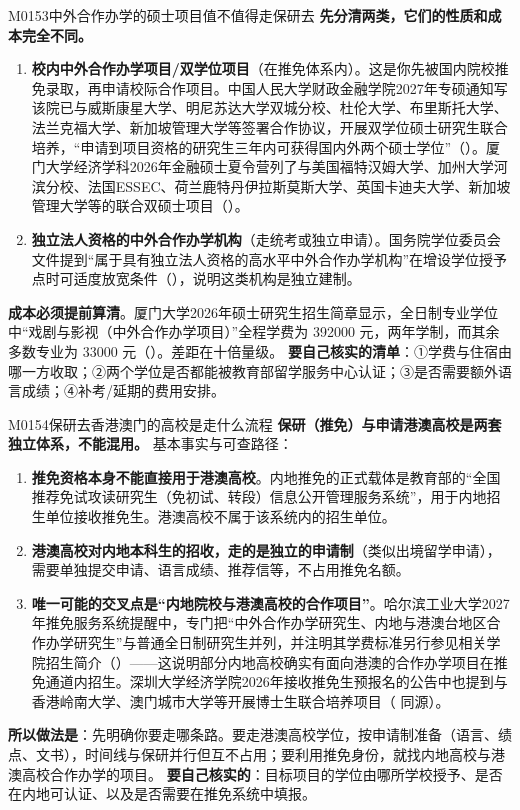 \begin{qa}{M0153}{中外合作办学的硕士项目值不值得走保研去}
\textbf{先分清两类，它们的性质和成本完全不同。}
\begin{enumerate}
  \item \textbf{校内中外合作办学项目/双学位项目}（在推免体系内）。这是你先被国内院校推免录取，再申请校际合作项目。中国人民大学财政金融学院2027年专硕通知写该院已与威斯康星大学、明尼苏达大学双城分校、杜伦大学、布里斯托大学、法兰克福大学、新加坡管理大学等签署合作协议，开展双学位硕士研究生联合培养，“申请到项目资格的研究生三年内可获得国内外两个硕士学位”（）。厦门大学经济学科2026年金融硕士夏令营列了与美国福特汉姆大学、加州大学河滨分校、法国ESSEC、荷兰鹿特丹伊拉斯莫斯大学、英国卡迪夫大学、新加坡管理大学等的联合双硕士项目（）。
  \item \textbf{独立法人资格的中外合作办学机构}（走统考或独立申请）。国务院学位委员会文件提到“属于具有独立法人资格的高水平中外合作办学机构”在增设学位授予点时可适度放宽条件（），说明这类机构是独立建制。
\end{enumerate}
\textbf{成本必须提前算清}。厦门大学2026年硕士研究生招生简章显示，全日制专业学位中“戏剧与影视（中外合作办学项目）”全程学费为 392000 元，两年学制，而其余多数专业为 33000 元（）。差距在十倍量级。
\textbf{要自己核实的清单}：①学费与住宿由哪一方收取；②两个学位是否都能被教育部留学服务中心认证；③是否需要额外语言成绩；④补考/延期的费用安排。
\end{qa}

\begin{qa}{M0154}{保研去香港澳门的高校是走什么流程}
\textbf{保研（推免）与申请港澳高校是两套独立体系，不能混用。} 基本事实与可查路径：
\begin{enumerate}
  \item \textbf{推免资格本身不能直接用于港澳高校}。内地推免的正式载体是教育部的“全国推荐免试攻读研究生（免初试、转段）信息公开管理服务系统”，用于内地招生单位接收推免生。港澳高校不属于该系统内的招生单位。
  \item \textbf{港澳高校对内地本科生的招收，走的是独立的申请制}（类似出境留学申请），需要单独提交申请、语言成绩、推荐信等，不占用推免名额。
  \item \textbf{唯一可能的交叉点是“内地院校与港澳高校的合作项目”}。哈尔滨工业大学2027年推免服务系统提醒中，专门把“中外合作办学研究生、内地与港澳台地区合作办学研究生”与普通全日制研究生并列，并注明其学费标准另行参见相关学院招生简介（）——这说明部分内地高校确实有面向港澳的合作办学项目在推免通道内招生。深圳大学经济学院2026年接收推免生预报名的公告中也提到与香港岭南大学、澳门城市大学等开展博士生联合培养项目（ 同源）。
\end{enumerate}
\textbf{所以做法是}：先明确你要走哪条路。要走港澳高校学位，按申请制准备（语言、绩点、文书），时间线与保研并行但互不占用；要利用推免身份，就找内地高校与港澳高校合作办学的项目。
\textbf{要自己核实的}：目标项目的学位由哪所学校授予、是否在内地可认证、以及是否需要在推免系统中填报。
\end{qa}

